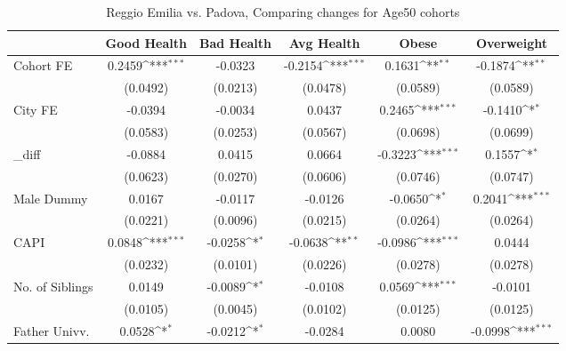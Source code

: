 \begin{table}[htbp]\centering
\def\sym#1{\ifmmode^{#1}\else\(^{#1}\)\fi}
\caption{Reggio Emilia vs. Padova, Comparing changes for Age50 cohorts}
\begin{tabular}{l*{5}{c}}
\toprule
            &\multicolumn{1}{c}{Good Health}&\multicolumn{1}{c}{Bad Health}&\multicolumn{1}{c}{Avg Health}&\multicolumn{1}{c}{Obese}&\multicolumn{1}{c}{Overweight}\\
\midrule
Cohort FE   &      0.2459\sym{***}&     -0.0323         &     -0.2154\sym{***}&      0.1631\sym{**} &     -0.1874\sym{**} \\
            &    (0.0492)         &    (0.0213)         &    (0.0478)         &    (0.0589)         &    (0.0589)         \\
\addlinespace
City FE     &     -0.0394         &     -0.0034         &      0.0437         &      0.2465\sym{***}&     -0.1410\sym{*}  \\
            &    (0.0583)         &    (0.0253)         &    (0.0567)         &    (0.0698)         &    (0.0699)         \\
\addlinespace
\_diff       &     -0.0884         &      0.0415         &      0.0664         &     -0.3223\sym{***}&      0.1557\sym{*}  \\
            &    (0.0623)         &    (0.0270)         &    (0.0606)         &    (0.0746)         &    (0.0747)         \\
\addlinespace
Male Dummy  &      0.0167         &     -0.0117         &     -0.0126         &     -0.0650\sym{*}  &      0.2041\sym{***}\\
            &    (0.0221)         &    (0.0096)         &    (0.0215)         &    (0.0264)         &    (0.0264)         \\
\addlinespace
CAPI        &      0.0848\sym{***}&     -0.0258\sym{*}  &     -0.0638\sym{**} &     -0.0986\sym{***}&      0.0444         \\
            &    (0.0232)         &    (0.0101)         &    (0.0226)         &    (0.0278)         &    (0.0278)         \\
\addlinespace
No. of Siblings&      0.0149         &     -0.0089\sym{*}  &     -0.0108         &      0.0569\sym{***}&     -0.0101         \\
            &    (0.0105)         &    (0.0045)         &    (0.0102)         &    (0.0125)         &    (0.0125)         \\
\addlinespace
Father Univv.&      0.0528\sym{*}  &     -0.0212\sym{*}  &     -0.0284         &      0.0080         &     -0.0998\sym{***}\\

\end{tabular}
\end{table}
